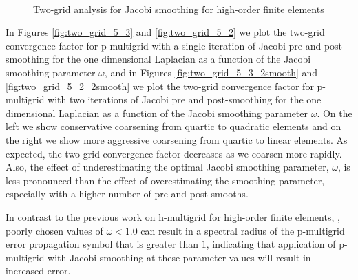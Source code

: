 \documentclass[review]{siamart190516}
\begin{document}
\begin{figure}[!tbp]
     \\
  \caption{Two-grid analysis for Jacobi smoothing for high-order finite elements}
\end{figure}

In Figures \ref{fig:two_grid_5_3} and \ref{fig:two_grid_5_2} we plot the two-grid convergence factor for p-multigrid with a single iteration of Jacobi pre and post-smoothing for the one dimensional Laplacian as a function of the Jacobi smoothing parameter $\omega$,
and in Figures \ref{fig:two_grid_5_3_2smooth} and \ref{fig:two_grid_5_2_2smooth} we plot the two-grid convergence factor for p-multigrid with two iterations of Jacobi pre and post-smoothing for the one dimensional Laplacian as a function of the Jacobi smoothing parameter $\omega$.
On the left we show conservative coarsening from quartic to quadratic elements and on the right we show more aggressive coarsening from quartic to linear elements.
As expected, the two-grid convergence factor decreases as we coarsen more rapidly.
Also, the effect of underestimating the optimal Jacobi smoothing parameter, $\omega$, is less pronounced than the effect of overestimating the smoothing parameter, especially with a higher number of pre and post-smooths.

In contrast to the previous work on h-multigrid for high-order finite elements, \cite{he2020two}, poorly chosen values of $\omega < 1.0$ can result in a spectral radius of the p-multigrid error propagation symbol that is greater than $1$, indicating that application of p-multigrid with Jacobi smoothing at these parameter values will result in increased error.
\end{document}
